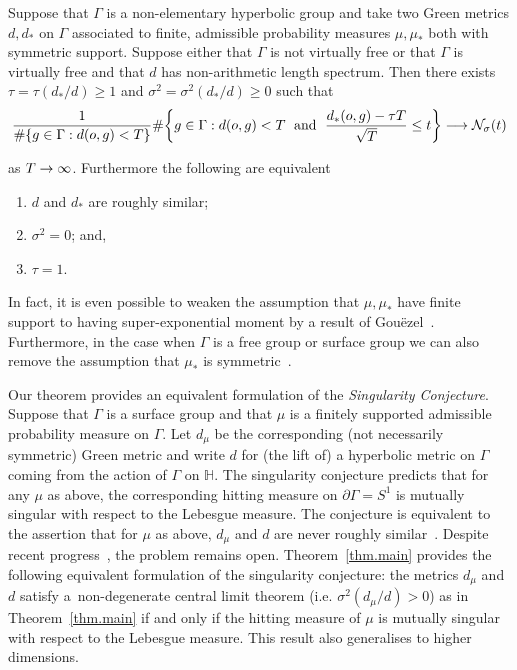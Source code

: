 \documentclass[AHL,Unicode,longabstracts,published]{cedram}
\newcommand{\G}{\Gamma}
\newcommand{\Nc}{\mathcal{N}}
\renewcommand{\H}{\mathbb{H}}
\let\originalleft\left
\let\originalright\right
\renewcommand{\left}{\mathopen{}\mathclose\bgroup\originalleft}
\renewcommand{\right}{\aftergroup\egroup\originalright}
\renewcommand*{\to}{\mathchoice{\longrightarrow}{\rightarrow}{\rightarrow}{\rightarrow}}
\newcounter{setofcase}
\newcounter{case}[setofcase]
\theoremstyle{plain}
\newcommand{\G}{\Gamma}
\begin{document}
\begin{theo}
Suppose that $\G$ is a non-elementary hyperbolic group and take two Green metrics $d, d_\ast$ on $\G$ associated to finite, admissible probability measures $\mu, \mu_\ast$ both with symmetric support. Suppose either that $\G$ is not virtually free or that $\G$ is virtually free and that $d$ has non-arithmetic length spectrum. Then there exists $\tau = \tau(d_\ast/d) \ge 1$ and $\sigma^2 = \sigma^2(d_\ast/d) \ge 0$ such that
\begin{align*}
\frac{1}{\#\left\{ g \in \G: d(o,g) < T\right\}}
\#\left\{ g \in \G: d(o,g) < T\; \text{ and } \; \frac{d_\ast(o,g) - \tau T}{\sqrt{T}} \le t \right\} \to \Nc_\sigma(t)
\end{align*}
\pagebreak{}

\noindent as $T\to\infty$. Furthermore the following are equivalent
\begin{enumerate}
\item\label{theo1.4.1} $d$ and $d_\ast$ are roughly similar;
\item\label{theo1.4.2} $\sigma^2 = 0$; and,
\item\label{theo1.4.3} $\tau = 1$.
\end{enumerate}
\end{theo}

In fact, it is even possible to weaken the assumption that $\mu, \mu_\ast$ have finite support to having super-exponential moment by a result of Gou\"ezel~\cite{GouezelAncona}. Furthermore, in the case when $\G$ is a free group or surface group we can also remove the assumption that $\mu_\ast$ is symmetric~\cite{GouezelLocalLimit}.



\begin{rema}
Our theorem provides an equivalent formulation of the \emph{Singularity Conjecture}. Suppose that $\G$ is a surface group and that $\mu$ is a finitely supported admissible probability measure on $\G$. Let $d_\mu$ be the corresponding (not necessarily symmetric) Green metric and write $d$ for (the lift of) a hyperbolic metric on $\G$ coming from the action of $\G$ on $\H$. The {singularity conjecture} predicts that for any $\mu$ as above, the corresponding hitting measure on $\partial \G = S^1$ is mutually singular with respect to the Lebesgue measure. The conjecture is equivalent to the assertion that for $\mu$ as above, $d_\mu$ and $d$ are never roughly similar~\cite{GMM2018}. Despite recent progress~\cite{lessa.1,lessa.2,kosenko,kosenko.tiozzo}, the problem remains open. Theorem~\ref{thm.main} provides the following equivalent formulation of the singularity conjecture: the metrics $d_\mu$ and $d$ satisfy a~non-degenerate central limit theorem (i.e. $\sigma^2(d_\mu/d) > 0$) as in Theorem~\ref{thm.main} if and only if the hitting measure of $\mu$ is mutually singular with respect to the Lebesgue measure. This result also generalises to higher dimensions.
\end{rema}
\end{document}
